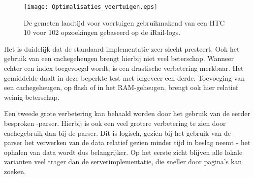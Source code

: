 \begin{figure}[h]
	\centering
	\texttt{[image: Optimalisaties\_voertuigen.eps]}
	\caption[Gemeten laadtijd voertuigen bij verschillende implementatiedetails]{De gemeten laadtijd voor voertuigen gebruikmakend van een HTC 10 voor 102 opzoekingen gebaseerd op de iRail-logs. }
	\label{fig:vehiclelabtest}
\end{figure}

%		
%		

Het is duidelijk dat de standaard implementatie zeer slecht presteert. Ook het gebruik van een cachegeheugen brengt hierbij niet veel beterschap. Wanneer echter een index toegevoegd wordt, is een drastische verbetering merkbaar. Het gemiddelde daalt in deze beperkte test met ongeveer een derde. Toevoeging van een cachegeheugen, op flash of in het RAM-geheugen, brengt ook hier relatief weinig beterschap. 

Een tweede grote verbetering kan behaald worden door het gebruik van de eerder besproken -parser. Hierbij is ook een veel grotere verbetering te zien door cachegebruik dan bij de  parser. Dit is logisch, gezien bij het gebruik van de -parser het verwerken van de data relatief gezien minder tijd in beslag neemt - het ophalen van data wordt dus belangrijker. Op het eerste zicht blijven alle lokale varianten veel trager dan de serverimplementatie, die sneller door pagina's kan zoeken.

